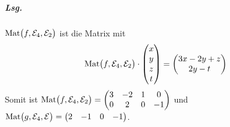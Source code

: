 \documentclass{scrreprt}
\newcommand\Mat{\text{Mat}}
\begin{document}
\begin{enumerate}[(a)]
  \subparagraph{Lsg.} $\Mat\qty\big(f, \mathcal{E}_4, \mathcal{E}_2)$ ist die
  Matrix mit
  \[
    \Mat\qty\big(f, \mathcal{E}_4, \mathcal{E}_2) \cdot
    \begin{pmatrix} x \\ y \\ z \\ t \end{pmatrix} =
    \begin{pmatrix} 3x - 2y + z \\ 2y - t \end{pmatrix}
  \]
  Somit ist $\Mat\qty\big(f, \mathcal{E}_4, \mathcal{E}_2) =
  \begin{pmatrix}
    3 & -2 & 1 & 0 \\
    0 & 2 & 0 & -1
  \end{pmatrix}$
  und
  $\Mat\qty\big(g, \mathcal{E}_4, \mathcal{E}) =
  \begin{pmatrix}
    2 & -1 & 0 & -1
  \end{pmatrix}$.
\end{enumerate}
\end{document}
